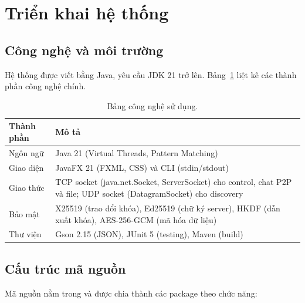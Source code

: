 \section{Triển khai hệ thống}
\begingroup
\setlength{\emergencystretch}{2em}

\subsection{Công nghệ và môi trường}

Hệ thống được viết bằng Java, yêu cầu JDK 21 trở lên. Bảng~\ref{tab:tech-stack} liệt kê các thành phần công nghệ chính.

\begin{table}[H]\centering\small
\begin{tabularx}{\linewidth}{l >{\raggedright\arraybackslash}X}
\toprule
Thành phần & Mô tả \\
\midrule
Ngôn ngữ & Java 21 (Virtual Threads, Pattern Matching) \\
Giao diện & JavaFX 21 (FXML, CSS) và CLI (stdin/stdout) \\
Giao thức & TCP socket (java.net.Socket, ServerSocket) cho control, chat P2P và file; UDP socket (DatagramSocket) cho discovery \\
Bảo mật & X25519 (trao đổi khóa), Ed25519 (chữ ký server), HKDF (dẫn xuất khóa), AES-256-GCM (mã hóa dữ liệu) \\
Thư viện & Gson 2.15 (JSON), JUnit 5 (testing), Maven (build) \\
\bottomrule
\end{tabularx}
\caption{Bảng công nghệ sử dụng.}
\label{tab:tech-stack}
\end{table}

\subsection{Cấu trúc mã nguồn}

Mã nguồn nằm trong  và được chia thành các package theo chức năng:

